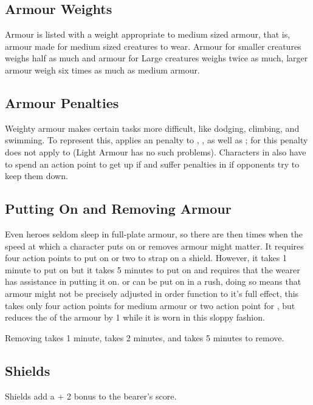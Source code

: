 \subsection{Armour Weights}
Armour is listed with a weight appropriate to medium sized armour, that is, armour made for medium sized creatures to wear. Armour for smaller creatures weighs half as much and armour for Large creatures weighs twice as much, larger armour weigh six times as much as medium armour.

\subsection{Armour Penalties}
Weighty armour makes certain tasks more difficult, like dodging, climbing, and swimming. To represent this,  applies an  penalty to , , as well as ; for  this penalty does not apply to  (Light Armour has no such problems). Characters in  also have to spend an action point to get up if  and suffer  penalties in  if opponents try to keep them down.

\subsection{Putting On and Removing Armour}
Even heroes seldom sleep in full-plate armour, so there are then times when the speed at which a character puts on or removes armour might matter. It requires four action points to put on  or two to strap on a shield. However, it takes 1 minute to put on  but it takes 5 minutes to put on  and requires that the wearer has assistance in putting it on.  or  can be put on in a rush, doing so means that armour might not be precisely adjusted in order function to it's full effect, this takes only four action points for medium armour or two action point for , but reduces the  of the armour by 1 while it is worn in this sloppy fashion.

Removing  takes 1 minute,  takes 2 minutes, and  takes 5 minutes to remove.


\subsection{Shields}
\label{sec:shields}
Shields add a + 2 bonus to the bearer's  score. 

